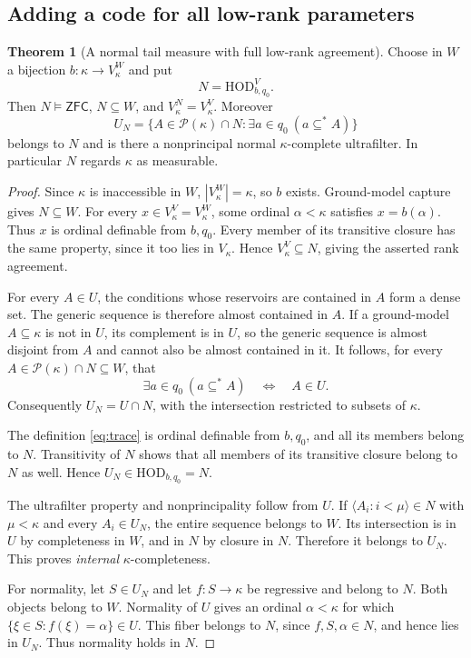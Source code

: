 \documentclass[11pt,letterpaper]{article}
\theoremstyle{definition}
\newtheorem{theorem}[definition]{Theorem}
\numberwithin{equation}{section}
\newcommand{\ZFC}{\mathsf{ZFC}}
\newcommand{\HOD}{\mathrm{HOD}}
\newcommand{\Pow}{\mathcal P}
\begin{document}
\subsection{Adding a code for all low-rank parameters}

\begin{theorem}[A normal tail measure with full low-rank agreement]\label{thm:trace}
Choose in $W$ a bijection $b:\kappa\to V_\kappa^W$ and put
\[
 N=\HOD_{b,q_0}^{V}.
\]
Then $N\models\ZFC$, $N\subseteq W$, and $V_\kappa^N=V_\kappa^V$. Moreover
\[
 U_N=\{A\in\Pow(\kappa)\cap N:
                      \exists a\in q_0\ (a\subseteq^* A)\}
 \label{eq:trace}\tag{16}
\]
belongs to $N$ and is there a nonprincipal normal $\kappa$-complete ultrafilter. In particular $N$ regards $\kappa$ as measurable.
\end{theorem}

\begin{proof}
Since $\kappa$ is inaccessible in $W$, $|V_\kappa^W|=\kappa$, so $b$ exists. Ground-model capture gives $N\subseteq W$. For every $x\in V_\kappa^V=V_\kappa^W$, some ordinal $\alpha<\kappa$ satisfies $x=b(\alpha)$. Thus $x$ is ordinal definable from $b,q_0$. Every member of its transitive closure has the same property, since it too lies in $V_\kappa$. Hence $V_\kappa^V\subseteq N$, giving the asserted rank agreement.

For every $A\in U$, the conditions whose reservoirs are contained in $A$ form a dense set. The generic sequence is therefore almost contained in $A$. If a ground-model $A\subseteq\kappa$ is not in $U$, its complement is in $U$, so the generic sequence is almost disjoint from $A$ and cannot also be almost contained in it. It follows, for every $A\in\Pow(\kappa)\cap N\subseteq W$, that
\[
 \exists a\in q_0\ (a\subseteq^* A)
       \quad\Longleftrightarrow\quad A\in U.
\]
Consequently $U_N=U\cap N$, with the intersection restricted to subsets of $\kappa$.

The definition \eqref{eq:trace} is ordinal definable from $b,q_0$, and all its members belong to $N$. Transitivity of $N$ shows that all members of its transitive closure belong to $N$ as well. Hence $U_N\in\HOD_{b,q_0}=N$.

The ultrafilter property and nonprincipality follow from $U$. If $\langle A_i:i<\mu\rangle\in N$ with $\mu<\kappa$ and every $A_i\in U_N$, the entire sequence belongs to $W$. Its intersection is in $U$ by completeness in $W$, and in $N$ by closure in $N$. Therefore it belongs to $U_N$. This proves \emph{internal} $\kappa$-completeness.

For normality, let $S\in U_N$ and let $f:S\to\kappa$ be regressive and belong to $N$. Both objects belong to $W$. Normality of $U$ gives an ordinal $\alpha<\kappa$ for which
$\{\xi\in S:f(\xi)=\alpha\}\in U$. This fiber belongs to $N$, since $f,S,\alpha\in N$, and hence lies in $U_N$. Thus normality holds in $N$.
\end{proof}
\end{document}

